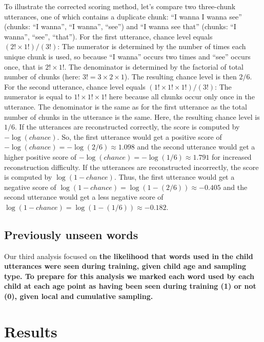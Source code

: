 \documentclass[man,mask,floatsintext]{apa6}
\begin{document}
To illustrate the corrected scoring method, let's compare two
three-chunk utterances, one of which contains a duplicate chunk:
\enquote{I wanna I wanna see} (chunks: \enquote{I wanna}, \enquote{I
wanna}, \enquote{see}) and \enquote{I wanna see that} (chunks:
\enquote{I wanna}, \enquote{see}, \enquote{that}). For the first
utterance, chance level equals \((2!\times1!)/(3!)\): The numerator is
determined by the number of times each unique chunk is used, so because
\enquote{I wanna} occurs two times and \enquote{see} occurs once, that
is \(2!\times1!\). The denominator is determined by the factorial of
total number of chunks (here: \(3! = 3\times2\times1\)). The resulting
chance level is then \(2/6\). For the second utterance, chance level
equals \((1!\times1!\times1!)/(3!)\): The numerator is equal to
\(1!\times1!\times1!\) here because all chunks occur only once in the
utterance. The denominator is the same as for the first utterance as the
total number of chunks in the utterance is the same. Here, the resulting
chance level is \(1/6\). If the utterances are reconstructed correctly,
the score is computed by \(-\log(chance)\). So, the first utterance
would get a positive score of
\(-\log(chance) = -\log(2/6) \approx 1.098\) and the second utterance
would get a higher positive score of
\(-\log(chance) = -\log(1/6) \approx 1.791\) for increased
reconstruction difficulty. If the utterances are reconstructed
incorrectly, the score is computed by \(\log(1-chance)\). Thus, the
first utterance would get a negative score of
\(\log(1-chance) = \log(1-(2/6)) \approx -0.405\) and the second
utterance would get a less negative score of
\(\log(1-chance) = \log(1-(1/6)) \approx -0.182\).

\subsection{Previously unseen words}\label{previously-unseen-words}

Our third analysis focused on \textbf{the likelihood that words used in
the child utterances were seen during training, given child age and
sampling type. To prepare for this analysis we marked each word used by
each child at each age point as having been seen during training (1) or
not (0), given local and cumulative sampling.}

\section{Results}\label{results}
\end{document}
